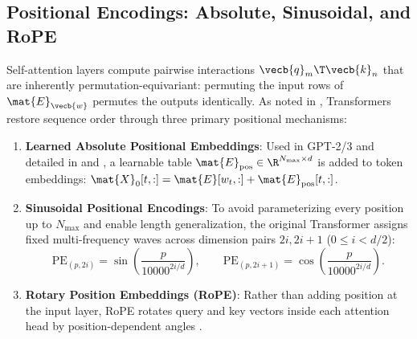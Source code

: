 \documentclass[../../../../master.tex]{subfiles}
\begin{document}
\subsection{Positional Encodings: Absolute, Sinusoidal, and RoPE}

Self-attention layers compute pairwise interactions $\vecb{q}_m\T \vecb{k}_n$ that are inherently permutation-equivariant: permuting the input rows of $\mat{E}_{\vecb{w}}$ permutes the outputs identically. As noted in , Transformers restore sequence order through three primary positional mechanisms:

\begin{enumerate}
  \item \textbf{Learned Absolute Positional Embeddings}: Used in GPT-2/3 and detailed in  and , a learnable table $\mat{E}_{\mathrm{pos}} \in \R^{N_{\max} \times d}$ is added to token embeddings: $\mat{X}_0[t, :] = \mat{E}[w_t, :] + \mat{E}_{\mathrm{pos}}[t, :]$.
  \item \textbf{Sinusoidal Positional Encodings}: To avoid parameterizing every position up to $N_{\max}$ and enable length generalization, the original Transformer assigns fixed multi-frequency waves across dimension pairs $2i, 2i+1$ ($0 \le i < d/2$):
\begin{equation}
  \mathrm{PE}_{(p, 2i)} = \sin\!\left(\frac{p}{10000^{2i/d}}\right), \qquad
  \mathrm{PE}_{(p, 2i+1)} = \cos\!\left(\frac{p}{10000^{2i/d}}\right).
  \label{eq:tok:sinusoid}
\end{equation}
  \item \textbf{Rotary Position Embeddings (RoPE)}: Rather than adding position at the input layer, RoPE rotates query and key vectors inside each attention head by position-dependent angles .
\end{enumerate}
\end{document}
